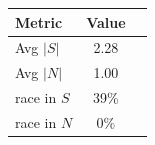 \begin{tabular}{lcc}\toprule
Metric & Value\\\midrule
Avg $|S|$ & 2.28\\
Avg $|N|$ & 1.00\\
race in $S$ & 39\%\\
race in $N$ & 0\%\\
\bottomrule\end{tabular}
